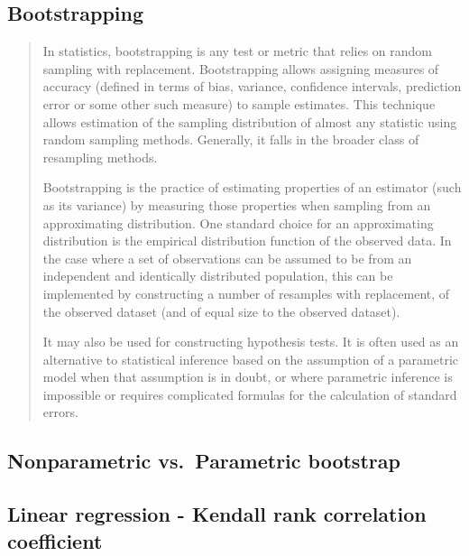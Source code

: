 \documentclass[]{article}
\begin{document}
\hypertarget{bootstrapping}{%
\subsection{Bootstrapping}\label{bootstrapping}}

\begin{quote}
In statistics, bootstrapping is any test or metric that relies on random
sampling with replacement. Bootstrapping allows assigning measures of
accuracy (defined in terms of bias, variance, confidence intervals,
prediction error or some other such measure) to sample estimates. This
technique allows estimation of the sampling distribution of almost any
statistic using random sampling methods. Generally, it falls in the
broader class of resampling methods.

Bootstrapping is the practice of estimating properties of an estimator
(such as its variance) by measuring those properties when sampling from
an approximating distribution. One standard choice for an approximating
distribution is the empirical distribution function of the observed
data. In the case where a set of observations can be assumed to be from
an independent and identically distributed population, this can be
implemented by constructing a number of resamples with replacement, of
the observed dataset (and of equal size to the observed dataset).

It may also be used for constructing hypothesis tests. It is often used
as an alternative to statistical inference based on the assumption of a
parametric model when that assumption is in doubt, or where parametric
inference is impossible or requires complicated formulas for the
calculation of standard errors.
\end{quote}

\hypertarget{nonparametric-vs.-parametric-bootstrap}{%
\subsection{Nonparametric vs.~Parametric
bootstrap}\label{nonparametric-vs.-parametric-bootstrap}}

\hypertarget{linear-regression---kendall-rank-correlation-coefficient}{%
\subsection{Linear regression - Kendall rank correlation
coefficient}\label{linear-regression---kendall-rank-correlation-coefficient}}
\end{document}

